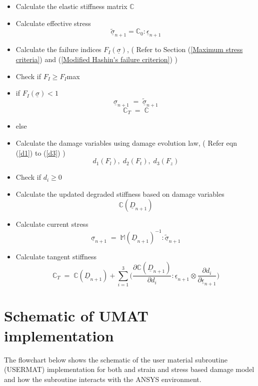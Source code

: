 \documentclass[12pt,a4paper,twoside,openright]{report}
\begin{document}
\begin{itemize}
\item Calculate the elastic stiffness matrix  \textbf{$\mathbb{C}$}
\item Calculate effective stress \textbf{$$\underline{\tilde{\sigma}}_{n+1} = \mathbb{C}_{0} : \underline{\epsilon}_{n+1} $$}
\item Calculate the failure indices \textbf{$F_{I}(\underline{\sigma})$},\;\; ( Refer to Section (\ref{Maximum stress criteria}) and (\ref{Modified Hashin's failure criterion}) )
\item[] Check if $F_{I} \geq F_{I}$max
\item if \textbf{$F_{I}(\underline{\sigma})<1$} \textbf{$$\underline{\sigma}_{n+1} \; = \; \underline{\tilde{\sigma}}_{n+1} $$} \textbf{$$\mathbb{C}_{T} \; = \; \mathbb{C}$$}
\item else
   	
\item[]  Calculate the damage variables using damage evolution law, \;\; ( Refer eqn (\ref{d1}) to (\ref{d3}) )  \textbf{$$d_{1}(F_{l}),\;d_{2}(F_{t}),\;d_{3}(F_{z})$$}  	
\item[]  Check if $d_{i} \geq 0 $ 
\item[]  Calculate the updated degraded stiffness based on damage variables \textbf{$$\mathbb{C}(\underline{D}_{n+1})$$}
\item[]  Calculate current stress  \textbf{$$\underline{\sigma}_{n+1} \; = \;  \mathbb{M}(\underline{D}_{n+1})^{-1}:\underline{\tilde{\sigma}}_{n+1} $$}
\item[] Calculate tangent stiffness \textbf{$$\mathbb{C}_{T}  \; = \;\mathbb{C}(\underline{D}_{n+1}) + \sum_{i = 1}^{3} \Big( \frac{\partial \mathbb{C}(\underline{D}_{n+1}) }{\partial d_{i}} : \underline{\epsilon}_{n+1} \otimes \frac{\partial d_{i}}{\partial \underline{\epsilon}_{n+1} }\Big)$$}
	
\end{itemize} 

\newpage
\section{Schematic of UMAT implementation}
\indent\indent\indent The flowchart below shows the schematic of the user material subroutine (USERMAT) implementation for both and strain and stress based damage model and how the subroutine interacts with the ANSYS environment.
\end{document}
